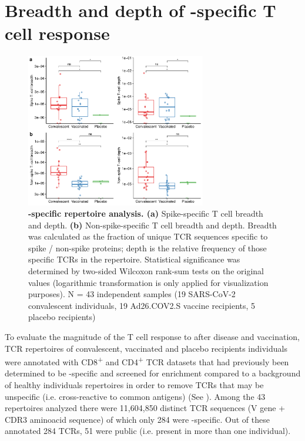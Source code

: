 \section*{Breadth and depth of \covid-specific T cell response}


\begin{figure}[t]
	\centering
	\includegraphics[width=0.7\textwidth,keepaspectratio]{figures/fig2.pdf}
	\caption{\textbf{\covid-specific \TCRB{} repertoire analysis. (a)} Spike-specific T cell breadth and depth. \textbf{(b)} Non-spike-specific T cell breadth and depth. Breadth was calculated as the fraction of unique TCR sequences specific to spike / non-spike proteins; depth is the relative frequency of those specific TCRs in the repertoire. Statistical significance was determined by two-sided Wilcoxon rank-sum tests on the original values (logarithmic transformation is only applied for visualization purposes). N = 43 independent samples (19 SARS-CoV-2 convalescent individuals, 19 Ad26.COV2.S vaccine recipients, 5 placebo recipients)}
	\label{fig:bd}
\end{figure}







To evaluate the magnitude of the T cell response to \covid{} after disease and vaccination, TCR repertoires of convalescent, vaccinated and placebo recipients individuals were annotated with CD8\textsuperscript{+} and CD4\textsuperscript{+} TCR datasets that had previously been determined to be \covid-specific and screened for enrichment compared to a background of healthy individuals repertoires in order to remove TCRs that may be unspecific (i.e. cross-reactive to common antigens) (See ). Among the 43 repertoires analyzed there were 11,604,850 distinct TCR sequences (V gene + CDR3 aminoacid sequence) of which only 284 were \covid-specific. Out of these annotated 284 TCRs, 51 were public (i.e. present in more than one individual).

